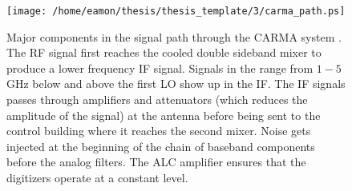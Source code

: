 \begin{figure}[!ht]
\centering 
          \texttt{[image: /home/eamon/thesis/thesis\_template/3/carma\_path.ps]}
\caption[Major components in the signal path for CARMA]{Major components in the signal path through the CARMA system \citep{wei_2008}. The RF signal first reaches the cooled double sideband mixer to produce a lower frequency IF signal.	Signals in the range from $1-5$\,GHz below and above the first LO show up in the IF. The IF signals passes through amplifiers and attenuators (which reduces the amplitude of the signal) at the antenna before being sent to the control building where it reaches the second mixer. Noise gets injected at the beginning of the chain of baseband components before the analog filters. The ALC amplifier ensures that the digitizers operate at a constant level.}
\label{fig3.4}
\end{figure}

